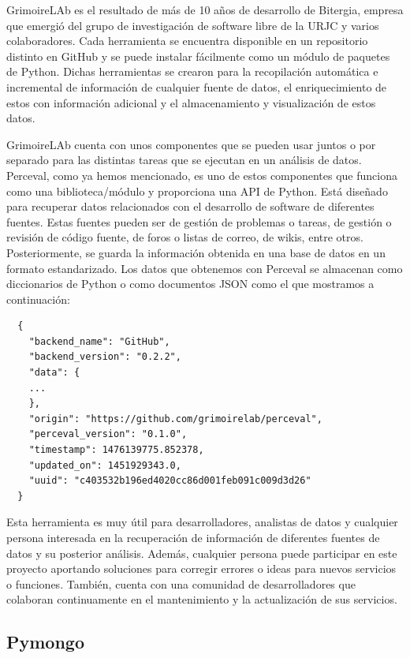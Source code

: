 \documentclass[a4paper, 12pt]{book}
\begin{document}
GrimoireLAb es el resultado de más de 10 años de desarrollo de Bitergia, empresa que emergió del grupo de investigación de software libre de la URJC y varios colaboradores. 
Cada herramienta se encuentra disponible en un repositorio distinto en GitHub y se puede instalar fácilmente como un módulo de paquetes de Python.
Dichas herramientas se crearon para la recopilación automática e incremental de información de cualquier fuente de datos, el enriquecimiento de estos con información adicional y el almacenamiento y visualización de estos datos. 


GrimoireLAb cuenta con unos componentes que se pueden usar juntos o por separado para las distintas tareas que se ejecutan en un análisis de datos.  
Perceval, como ya hemos mencionado, es uno de estos componentes que funciona como una biblioteca/módulo y proporciona una API de Python.
Está diseñado para recuperar datos relacionados con el desarrollo de software de diferentes fuentes.
Estas fuentes pueden ser de gestión de problemas o tareas, de gestión o revisión de código fuente, de foros o listas de correo, de wikis, entre otros.
Posteriormente, se guarda la información obtenida en una base de datos en un formato estandarizado.
Los datos que obtenemos con Perceval se almacenan como diccionarios de Python o como documentos JSON como el que mostramos a continuación: 

{\footnotesize
\begin{verbatim}
  {
    "backend_name": "GitHub",
    "backend_version": "0.2.2",
    "data": {
    ...
    },
    "origin": "https://github.com/grimoirelab/perceval",
    "perceval_version": "0.1.0",
    "timestamp": 1476139775.852378,
    "updated_on": 1451929343.0,
    "uuid": "c403532b196ed4020cc86d001feb091c009d3d26"
  }
\end{verbatim}
}

Esta herramienta es muy útil para desarrolladores, analistas de datos y cualquier persona interesada en la recuperación de información de diferentes fuentes de datos y su posterior análisis.
Además, cualquier persona puede participar en este proyecto aportando soluciones para corregir errores o ideas para nuevos servicios o funciones.
También, cuenta con una comunidad de desarrolladores que colaboran continuamente en el mantenimiento y la actualización de sus servicios. 

\subsection{Pymongo} %
\label{sec:pymongo} %
\end{document}
